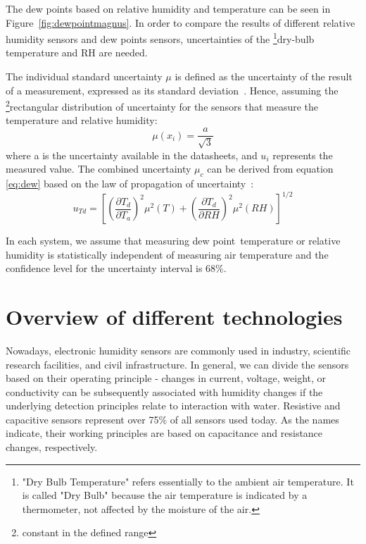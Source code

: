 The dew points based on relative humidity and temperature can be seen in Figure~\ref{fig:dewpointmagnus}. In order to compare the results of different relative humidity sensors and dew points sensors, uncertainties of the \footnote{"Dry Bulb Temperature" refers essentially to the ambient air temperature. It is called "Dry Bulb" because the air temperature is indicated by a thermometer, not affected by the moisture of the air.}{dry-bulb} temperature and \gls{RH} are needed.

The individual standard uncertainty $\mu$ is defined as the uncertainty of the result of a measurement, expressed as its standard deviation~\cite{NIST_1994}. Hence, assuming the \footnote{constant in the defined range}{rectangular} distribution of uncertainty for the sensors that measure the temperature and relative humidity:
\begin{equation}
    \mu(x_{i}) = \frac{a}{\sqrt{3}}
\end{equation}
where a is the uncertainty available in the datasheets, and $u_{i}$ represents the measured value. The combined uncertainty $\mu_{c}$ can be derived from equation \ref{eq:dew} based on the law of propagation of uncertainty~\cite{dp_uncertainty}:
\begin{equation}
    u_{Td} = \left [  \left (\frac{\partial T_{d}}{\partial T_{a}}  \right )^{2} \mu^{2}(T) + \left (\frac{\partial T_{d}}{\partial RH}  \right )^{2} \mu^{2}(RH)\right ]^{1/2}
    \label{dp_error}
\end{equation}

In each system, we assume that measuring dew point temperature or relative humidity is statistically independent of measuring air temperature and the confidence level for the uncertainty interval is 68\%.  

\section{Overview of different technologies}

Nowadays, electronic humidity sensors are commonly used in industry, scientific research facilities, and civil infrastructure. In general, we can divide the sensors based on their operating principle - changes in current, voltage, weight, or conductivity can be subsequently associated with humidity changes if the underlying detection principles relate to interaction with water. Resistive and capacitive sensors represent over 75\% of all sensors used today. As the names indicate, their working principles are based on capacitance and resistance changes, respectively.


